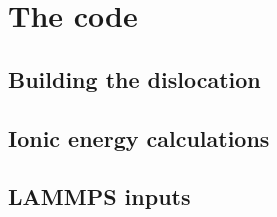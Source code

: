 \chapter{The code}

\section{Building the dislocation}

\section{Ionic energy calculations}
\label{sec:ionic_energy_code}
%


\section{LAMMPS inputs}
\label{sec:lammps_input}
